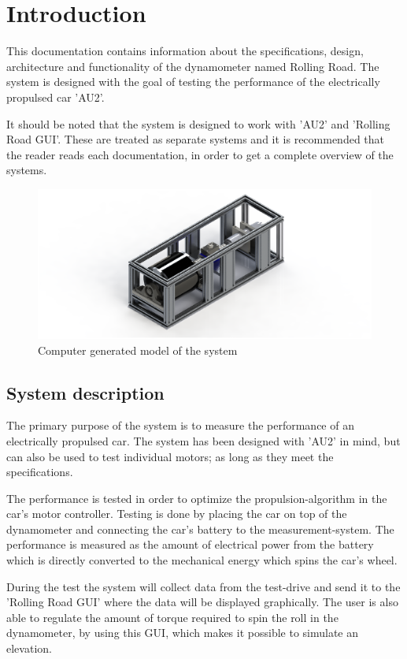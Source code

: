 \chapter{Introduction}
This documentation contains information about the specifications, design, architecture and functionality of the dynamometer named Rolling Road. The system is designed with the goal of testing the performance of the electrically propulsed car 'AU2'.

It should be noted that the system is designed to work with 'AU2' and 'Rolling Road GUI'. These are treated as separate systems and it is recommended that the reader reads each documentation, in order to get a complete overview of the systems.

\begin{figure}[H]
	\centering
	\includegraphics[width=0.5\linewidth]{Introduction/Model}
	\caption{Computer generated model of the system}
	\label{fig:System_model}
\end{figure}

\section{System description}
The primary purpose of the system is to measure the performance of an electrically propulsed car. The system has been designed with 'AU2' in mind, but can also be used to test individual motors; as long as they meet the specifications.

The performance is tested in order to optimize the propulsion-algorithm in the car's motor controller. Testing is done by placing the car on top of the dynamometer and connecting the car's battery to the measurement-system. The performance is measured as the amount of electrical power from the battery which is directly converted to the mechanical energy which spins the car's wheel.

During the test the system will collect data from the test-drive and send it to the 'Rolling Road GUI' where the data will be displayed graphically. The user is also able to regulate the amount of torque required to spin the roll in the dynamometer, by using this GUI, which makes it possible to simulate an elevation.

